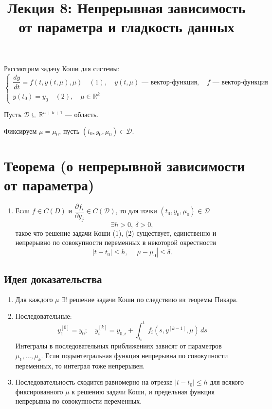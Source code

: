 \documentclass[a4paper,12pt]{article}
\title{\textbf{Лекция 8: Непрерывная зависимость от параметра и гладкость данных}}
\date{}
\begin{document}
\maketitle
Рассмотрим задачу Коши для системы:
\begin{equation}
    \begin{cases}
        \dfrac{dy}{dt} = f(t, y(t, \mu), \mu) \quad (1), \quad y(t, \mu) \text{ — вектор-функция}, \quad f \text{ — вектор-функция} \\
        y(t_0) = y_0 \quad (2), \quad \mu \in \mathbb{R}^k
    \end{cases}
\end{equation}

Пусть $ \mathcal{D}\subseteq \mathbb{R}^{n+k+1}$ — область.

Фиксируем $\mu = \mu_0$, пусть $(t_0, y_0, \mu_0) \in \mathcal{D}$.

\section{Теорема (о непрерывной зависимости от параметра)}
\begin{enumerate}[label=\arabic*)]
    \item Если \( f \in C(D) \) и \( \dfrac{\partial f_i}{\partial y_j} \in C(\mathcal{D}) \), то для точки \( (t_0, y_0, \mu_0) \in \mathcal{D} \)
    \[
        \exists h > 0,\ \delta > 0,
    \]
    такое что решение задачи Коши (1), (2) существует, единственно и  непрерывно по совокупности переменных в некоторой окрестности 
    \[
        |t - t_0| \leq h,\quad |\mu - \mu_0| \leq \delta.
    \]
\end{enumerate}

\subsection*{Идея доказательства}
\begin{enumerate}[label=\arabic*)]
    \item Для каждого $\mu$ $\exists!$ решение задачи Коши по следствию из теоремы Пикара.
    \item Последовательные: 
    \[
        y_1^{[0]} = y_0; \quad y_i^{[k]} = y_{0,i} + \int_{t_0}^t f_i(s, y^{[k-1]}, \mu) \, ds
    \]
    Интегралы в последовательных приближениях зависят от параметров $\mu_1, \dots, \mu_k$. Если подынтегральная функция непрерывна по совокупности переменных, то интеграл тоже непрерывен.
    \item Последовательность сходится равномерно {на отрезке $|t-t_0|\le h$ для всякого фиксированного $\mu$} к решению задачи Коши, и предельная функция непрерывна по совокупности переменных.
\end{enumerate}
\end{document}
